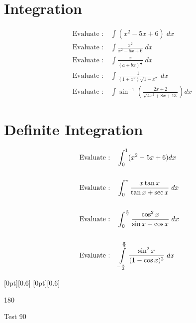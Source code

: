 \documentclass[17pt]{extarticle}
\begin{document}
\section{Integration}

\begin{align}
& \text{Evaluate :} \quad \int  (x^2 - 5x + 6)\;dx\\
& \text{Evaluate :}\quad \int  \frac{x^2}{x^2-5x + 6}\;dx  \\
& \text{Evaluate :}\quad \int  \frac{x}{(a+bx)^{\frac{1}{2}}} \;dx  \\
& \text{Evaluate :}\quad \int  \frac{1}{(1+x^2)\sqrt{1-x^2}}\;dx\\
& \text{Evaluate :}\quad \int  \sin^{-1}\left(\frac{2x+2}{\sqrt{4x^2+8x+13}}\right)dx
\end{align}

\section{Definite Integration}

\begin{align*}
& \text{Evaluate :} \quad \int_0^1  (x^2 - 5x + 6) dx\\ \\
& \text{Evaluate :}\quad \int_0^\pi  \frac{x\tan x}{\tan x + \sec x}\;dx  \\ \\
& \text{Evaluate :}\quad \int_0^{\frac{\pi}{2}} \frac{\cos^2x}{\sin x + \cos x} \;dx  \\ \\
& \text{Evaluate :}\quad \int\displaylimits_{-\frac{\pi}{3}}^{\frac{\pi}{3}} \frac{\sin^2x}{(1 -\cos x)^2}\;dx\\
\end{align*}

\raisebox{-0.5ex}[0pt][0.6\baselineskip]{}
\dotfill 
\raisebox {0.9ex}[0pt][0.6\baselineskip]{\begin{turn}{180} \end{turn}}


\begin{turn}{-90}Test 90\end{turn}
\end{document}
